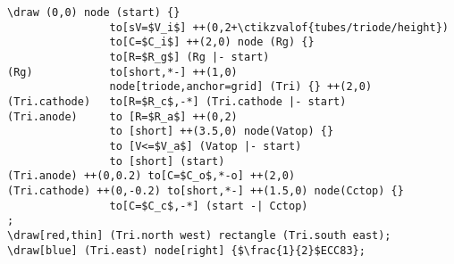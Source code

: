 \documentclass[a4paper]{article}
\begin{document}
\begin{lstlisting}
\draw (0,0) node (start) {}
            	to[sV=$V_i$] ++(0,2+\ctikzvalof{tubes/triode/height})
            	to[C=$C_i$] ++(2,0) node (Rg) {}
				to[R=$R_g$] (Rg |- start)
(Rg)			to[short,*-] ++(1,0)
				node[triode,anchor=grid] (Tri) {} ++(2,0)
(Tri.cathode)	to[R=$R_c$,-*] (Tri.cathode |- start)
(Tri.anode)		to [R=$R_a$] ++(0,2)
				to [short] ++(3.5,0) node(Vatop) {}
				to [V<=$V_a$] (Vatop |- start)
				to [short] (start)
(Tri.anode) ++(0,0.2) to[C=$C_o$,*-o] ++(2,0)
(Tri.cathode) ++(0,-0.2) to[short,*-] ++(1.5,0) node(Cctop) {}
				to[C=$C_c$,-*] (start -| Cctop)
;
\draw[red,thin] (Tri.north west) rectangle (Tri.south east);
\draw[blue] (Tri.east) node[right] {$\frac{1}{2}$ECC83};
\end{lstlisting}
\end{document}
